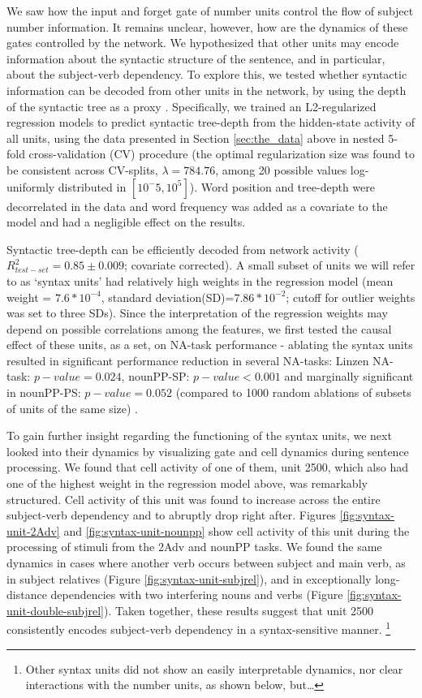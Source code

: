 We saw how the input and forget gate of number units control the flow
of subject number information. It remains unclear, however, how are
the dynamics of these gates controlled by the network. We hypothesized
that other units may encode information about the syntactic structure
of the sentence, and in particular, about the subject-verb
dependency. To explore this, we tested whether syntactic information
can be decoded from other units in the network, by using the depth of
the syntactic tree as a proxy \cite{Nelson:etal:2017}. Specifically,
we trained an L2-regularized regression models to predict
syntactic tree-depth from the hidden-state activity of all units,
using the data presented in Section \ref{sec:the_data} above in nested
5-fold cross-validation (CV) procedure (the optimal regularization size was found to be consistent across CV-splits, $\lambda=784.76$, among 20 possible values log-uniformly distributed in $[10^-5, 10^5]$). Word position and tree-depth were decorrelated in the data and word frequency was added as a covariate
to the model and had a negligible effect on the results.

Syntactic tree-depth can be efficiently decoded from network activity
($R^2_{test-set}=0.85\pm0.009$; covariate corrected). A small subset of units we will refer to
as `syntax units' had relatively high weights in the regression model (mean weight = $7.6*10^{-4}$, standard deviation(SD)=$7.86*10^{-2}$; cutoff for outlier weights was set to three SDs). Since the interpretation of the regression weights may depend on possible correlations among the features, we first tested the causal effect of these units, as a set, on NA-task performance - ablating the syntax units resulted in significant performance reduction in several NA-tasks: Linzen NA-task: $p-value=0.024$, nounPP-SP: $p-value<0.001$ and marginally significant in nounPP-PS: $p-value=0.052$ (compared to 1000 random ablations of subsets of units of the same size) .

To gain further insight regarding the functioning of the syntax units, we next looked into their dynamics by visualizing gate and cell dynamics during sentence processing. We found that
cell activity of one of them, unit \unit{2}{500},
which also had one of the highest weight in the regression model above, was
remarkably structured. Cell activity of this unit was found to
increase across the entire subject-verb dependency and to abruptly
drop right after. Figures \ref{fig:syntax-unit-2Adv} and
\ref{fig:syntax-unit-nounpp} show cell activity of this unit during
the processing of stimuli from the 2Adv and nounPP tasks. We found the
same dynamics in cases where another verb occurs between subject and
main verb, as in subject relatives (Figure
\ref{fig:syntax-unit-subjrel}), and in exceptionally long-distance
dependencies with two interfering nouns and verbs (Figure
\ref{fig:syntax-unit-double-subjrel}). Taken together, these results
suggest that unit \unit{2}{500} consistently encodes
subject-verb dependency in a syntax-sensitive manner. 
\footnote{Other syntax units did not show an easily interpretable
  dynamics, nor clear interactions with the number units, as shown below, but\ldots}

